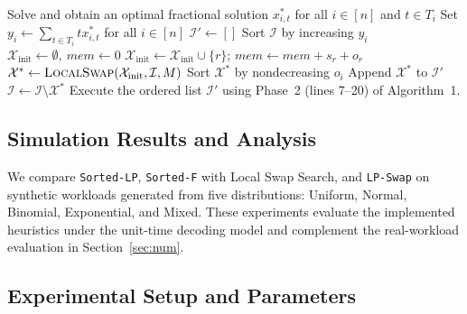 \documentclass[nonblindrev]{informs3_hide}
\newcommand{\sortF}{\texttt{Sorted-F}}
\newcommand{\sortLP}{\texttt{Sorted-LP}}
\newcommand{\LPSwap}{\texttt{LP-Swap}}
\begin{document}
\begin{algorithm}[htbp]
\caption{\LPSwap} \label{algorithm_LPswap}
\begin{algorithmic}[1]
\State Solve  and obtain an optimal fractional solution $x^*_{i,t}$ for all $i\in[n]$ and $t\in T_i$
\State Set $y_i \leftarrow \sum_{t\in T_i} t x^*_{i,t}$ for all $i\in[n]$
\State $\mathcal{I}' \gets []$
    \State Sort $\mathcal{I}$ by increasing $y_i$
    \State $\mathcal{X}_{\mathrm{init}}\gets\emptyset,\ mem\gets 0$
         \State $\mathcal{X}_{\mathrm{init}}\gets\mathcal{X}_{\mathrm{init}}\cup\{r\}$; $mem\gets mem+s_r+o_r$ \EndIf
    \EndFor
    \State $\mathcal{X}^* \gets \textsc{LocalSwap}(\mathcal{X}_{\mathrm{init}}, \mathcal{I}, M)$
    \State Sort $\mathcal{X}^*$ by nondecreasing $o_i$
    \State Append $\mathcal{X}^*$ to $\mathcal{I}'$
    \State $\mathcal{I}\gets \mathcal{I}\setminus \mathcal{X}^*$
\EndWhile
\State Execute the ordered list $\mathcal I'$ using Phase~2 (lines 7--20) of Algorithm~1.
\end{algorithmic}
\end{algorithm}


\subsection{Simulation Results and Analysis}
\label{append:simulation}

We compare \sortLP{}, \sortF{} with Local Swap Search, and
\LPSwap{} on synthetic workloads generated from five distributions:
Uniform, Normal, Binomial, Exponential, and Mixed. These experiments
evaluate the implemented heuristics under the unit-time decoding
model and complement the real-workload evaluation in
Section~\ref{sec:num}.

\subsection*{Experimental Setup and Parameters}
\end{document}
